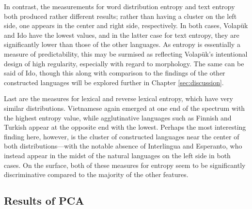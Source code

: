 \documentclass[12pt,a4paper]{article}
\numberwithin{figure}{section}
\numberwithin{table}{section}
\numberwithin{definition}{section}
\begin{document}
In contrast, the measurements for word distribution entropy and text entropy both produced rather different results; rather than having a cluster on the left side, one appears in the center and right side, respectively. In both cases, Volapük and Ido have the lowest values, and in the latter case for text entropy, they are significantly lower than those of the other languages. As entropy is essentially a measure of predictability, this may be surmised as reflecting Volapük's intentional design of high regularity, especially with regard to morphology. The same can be said of Ido, though this along with comparison to the findings of the other constructed languages will be explored further in Chapter \ref{sec:discussion}. 

Last are the measures for lexical and reverse lexical entropy, which have very similar distributions. Vietnamese again emerged at one end of the spectrum with the highest entropy value, while agglutinative languages such as Finnish and Turkish appear at the opposite end with the lowest. Perhaps the most interesting finding here, however, is the cluster of constructed languages near the center of both distributions---with the notable absence of Interlingua and Esperanto, who instead appear in the midst of the natural languages on the left side in both cases. On the surface, both of these measures for entropy seem to be significantly discriminative compared to the majority of the other features.



\subsection{Results of PCA}
\label{ssec:pcaresults}


\end{document}
